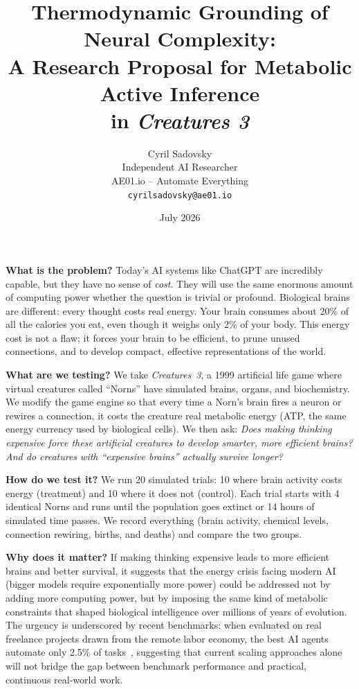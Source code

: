 \documentclass[12pt, a4paper]{article}
\title{%
  \textbf{Thermodynamic Grounding of Neural Complexity:}\\[6pt]
  \large A Research Proposal for Metabolic Active Inference\\in \textit{Creatures 3}%
}
\author{%
  Cyril Sadovsky\\[2pt]
  \small Independent AI Researcher\\
  \small AE01.io -- Automate Everything\\[2pt]
  \small \texttt{cyrilsadovsky@ae01.io}
}
\date{July 2026}
\begin{document}
\maketitle
\thispagestyle{fancy}

\begin{tcolorbox}[
  colback=yellow!5!white,
  colframe=black!70,
  coltitle=black,
  fonttitle=\large\bfseries,
  title={Plain Language Summary},
  boxrule=1pt,
  arc=3pt,
  left=8pt, right=8pt, top=6pt, bottom=6pt,
]
\textbf{What is the problem?}
Today's AI systems like ChatGPT are incredibly capable, but they have no sense of \emph{cost}. They will use the same enormous amount of computing power whether the question is trivial or profound. Biological brains are different: every thought costs real energy. Your brain consumes about 20\% of all the calories you eat, even though it weighs only 2\% of your body. This energy cost is not a flaw; it forces your brain to be efficient, to prune unused connections, and to develop compact, effective representations of the world.

\medskip
\textbf{What are we testing?}
We take \textit{Creatures~3}, a 1999 artificial life game where virtual creatures called ``Norns'' have simulated brains, organs, and biochemistry. We modify the game engine so that every time a Norn's brain fires a neuron or rewires a connection, it costs the creature real metabolic energy (ATP, the same energy currency used by biological cells). We then ask: \emph{Does making thinking expensive force these artificial creatures to develop smarter, more efficient brains? And do creatures with ``expensive brains'' actually survive longer?}

\medskip
\textbf{How do we test it?}
We run 20 simulated trials: 10 where brain activity costs energy (treatment) and 10 where it does not (control). Each trial starts with 4 identical Norns and runs until the population goes extinct or 14 hours of simulated time passes. We record everything (brain activity, chemical levels, connection rewiring, births, and deaths) and compare the two groups.

\medskip
\textbf{Why does it matter?}
If making thinking expensive leads to more efficient brains and better survival, it suggests that the energy crisis facing modern AI (bigger models require exponentially more power) could be addressed not by adding more computing power, but by imposing the same kind of metabolic constraints that shaped biological intelligence over millions of years of evolution. The urgency is underscored by recent benchmarks: when evaluated on real freelance projects drawn from the remote labor economy, the best AI agents automate only 2.5\% of tasks~\cite{mazeika2025rli}, suggesting that current scaling approaches alone will not bridge the gap between benchmark performance and practical, continuous real-world work.
\end{tcolorbox}
\end{document}
